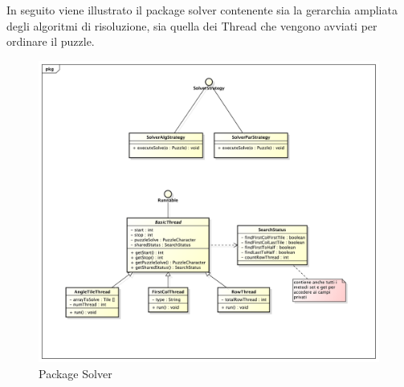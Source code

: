 		\noindent
		\\ \\
		In seguito viene illustrato il package solver contenente sia la gerarchia ampliata degli algoritmi di risoluzione, sia quella dei Thread che vengono avviati per ordinare il puzzle.
		\begin{figure}[htbp]
			\centering
			\centerline{\includegraphics[scale=0.5]{img/solver.pdf}}
			\caption{Package Solver}
			\label{Package solver}
		\end{figure}
		
		

